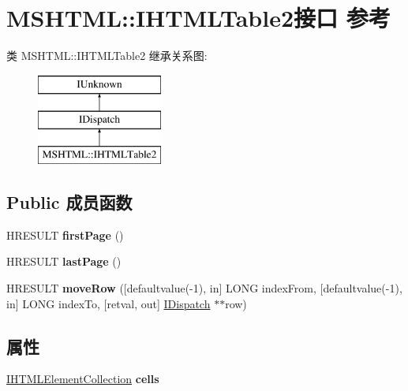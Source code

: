 \hypertarget{interface_m_s_h_t_m_l_1_1_i_h_t_m_l_table2}{}\section{M\+S\+H\+T\+ML\+:\+:I\+H\+T\+M\+L\+Table2接口 参考}
\label{interface_m_s_h_t_m_l_1_1_i_h_t_m_l_table2}
类 M\+S\+H\+T\+ML\+:\+:I\+H\+T\+M\+L\+Table2 继承关系图\+:\begin{figure}[H]
\begin{center}
\leavevmode
\includegraphics[height=3.000000cm]{interface_m_s_h_t_m_l_1_1_i_h_t_m_l_table2}
\end{center}
\end{figure}
\subsection*{Public 成员函数}
\begin{DoxyCompactItemize}
\item 
\mbox{\label{interface_m_s_h_t_m_l_1_1_i_h_t_m_l_table2_ab6b850c149df115e12cde9131fc99b58}} 
H\+R\+E\+S\+U\+LT {\bfseries first\+Page} ()
\item 
\mbox{\label{interface_m_s_h_t_m_l_1_1_i_h_t_m_l_table2_af941e9cc15361ffd1790448c9c3f2a6e}} 
H\+R\+E\+S\+U\+LT {\bfseries last\+Page} ()
\item 
\mbox{\label{interface_m_s_h_t_m_l_1_1_i_h_t_m_l_table2_a4558c872911b067c2400321d9f4730fe}} 
H\+R\+E\+S\+U\+LT {\bfseries move\+Row} (\mbox{[}defaultvalue(-\/1), in\mbox{]} L\+O\+NG index\+From, \mbox{[}defaultvalue(-\/1), in\mbox{]} L\+O\+NG index\+To, \mbox{[}retval, out\mbox{]} \hyperlink{interface_i_dispatch}{I\+Dispatch} $\ast$$\ast$row)
\end{DoxyCompactItemize}
\subsection*{属性}
\begin{DoxyCompactItemize}
\item 
\mbox{\label{interface_m_s_h_t_m_l_1_1_i_h_t_m_l_table2_a88e97879e096a020bcce14d07691f979}} 
\hyperlink{interface_m_s_h_t_m_l_1_1_i_h_t_m_l_element_collection}{I\+H\+T\+M\+L\+Element\+Collection} {\bfseries cells}
\end{DoxyCompactItemize}
